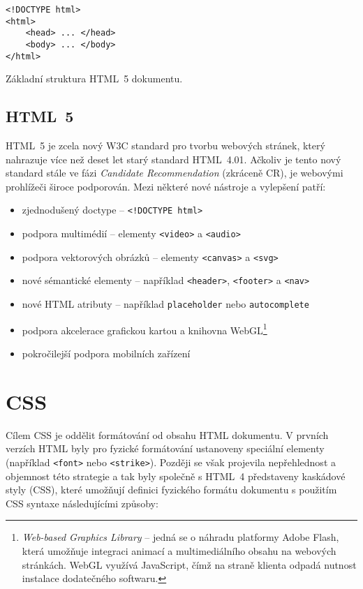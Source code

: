 \begin{example}
    \centering
    \begin{lstlisting}
<!DOCTYPE html>
<html>
    <head> ... </head>
    <body> ... </body>
</html>
    \end{lstlisting}
    \caption{Základní struktura HTML~5 dokumentu.}
    \label{example:html}
\end{example}

\subsection{HTML~5}

HTML~5 je zcela nový W3C standard pro tvorbu webových stránek, který nahrazuje více než deset let starý standard HTML~4.01. Ačkoliv je tento nový standard stále ve fázi \textit{Candidate Recommendation} (zkráceně CR), je webovými prohlížeči široce podporován. Mezi některé nové nástroje a vylepšení patří:

\begin{itemize}
    \item zjednodušený doctype -- \texttt{<!DOCTYPE html>}
    \item podpora multimédií -- elementy \texttt{<video>} a \texttt{<audio>}
    \item podpora vektorových obrázků -- elementy \texttt{<canvas>} a \texttt{<svg>}
    \item nové sémantické elementy -- například \texttt{<header>}, \texttt{<footer>} a \texttt{<nav>}
    \item nové HTML atributy -- například \texttt{placeholder} nebo \texttt{autocomplete}
    \item podpora akcelerace grafickou kartou a knihovna WebGL\footnote{\textit{Web-based Graphics Library} -- jedná se o náhradu platformy Adobe Flash, která umožňuje integraci animací a multimediálního obsahu na webových stránkách. WebGL využívá JavaScript, čímž na straně klienta odpadá nutnost instalace dodatečného softwaru.}
    \item pokročilejší podpora mobilních zařízení
\end{itemize}

\section{CSS}
\label{sec:css}

Cílem CSS je oddělit formátování od obsahu HTML dokumentu. V prvních verzích HTML byly pro fyzické formátování ustanoveny speciální elementy (například \texttt{<font>} nebo \texttt{<strike>}). Později se však projevila nepřehlednost a objemnost této strategie a tak byly společně s HTML~4 představeny kaskádové styly (CSS), které umožňují definici fyzického formátu dokumentu s použitím CSS syntaxe následujícími způsoby:

